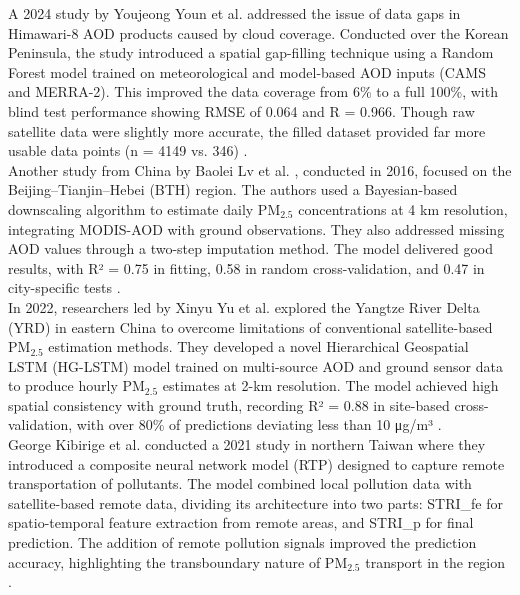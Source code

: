 \documentclass[12pt]{report}
\begin{document}
\noindent A 2024 study by Youjeong Youn et al. \cite{gap-filledKorea} addressed the issue of data gaps in Himawari-8 AOD products caused by cloud coverage. Conducted over the Korean Peninsula, the study introduced a spatial gap-filling technique using a Random Forest model trained on meteorological and model-based AOD inputs (CAMS and MERRA-2). This improved the data coverage from 6\% to a full 100\%, with blind test performance showing RMSE of 0.064 and R = 0.966. Though raw satellite data were slightly more accurate, the filled dataset provided far more usable data points (n = 4149 vs. 346) \cite{gap-filledKorea}.\\

\noindent Another study from China by Baolei Lv et al. \cite{Beijing-Tianjin-Hebei}, conducted in 2016, focused on the Beijing–Tianjin–Hebei (BTH) region. The authors used a Bayesian-based downscaling algorithm to estimate daily PM$_{2.5}$ concentrations at 4 km resolution, integrating MODIS-AOD with ground observations. They also addressed missing AOD values through a two-step imputation method. The model delivered good results, with R² = 0.75 in fitting, 0.58 in random cross-validation, and 0.47 in city-specific tests \cite{Beijing-Tianjin-Hebei}.\\

\noindent In 2022, researchers led by Xinyu Yu et al. \cite{HG-LSTM} explored the Yangtze River Delta (YRD) in eastern China to overcome limitations of conventional satellite-based PM$_{2.5}$ estimation methods. They developed a novel Hierarchical Geospatial LSTM (HG-LSTM) model trained on multi-source AOD and ground sensor data to produce hourly PM$_{2.5}$ estimates at 2-km resolution. The model achieved high spatial consistency with ground truth, recording R² = 0.88 in site-based cross-validation, with over 80\% of predictions deviating less than 10 μg/m³ \cite{HG-LSTM}.\\

\noindent George Kibirige et al. \cite{Taiwan} conducted a 2021 study in northern Taiwan where they introduced a composite neural network model (RTP) designed to capture remote transportation of pollutants. The model combined local pollution data with satellite-based remote data, dividing its architecture into two parts: STRI\_fe for spatio-temporal feature extraction from remote areas, and STRI\_p for final prediction. The addition of remote pollution signals improved the prediction accuracy, highlighting the transboundary nature of PM$_{2.5}$ transport in the region \cite{Taiwan}.\\
\end{document}
